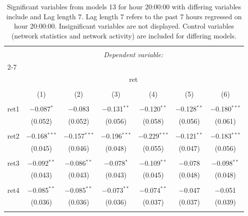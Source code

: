 
\begin{table}[!htbp] \centering 
  \caption{Significant variables from models 13 for hour 20:00:00 with differing variables include 
                               and Lag length 7. Lag length 7 refers to the past 7 hours regressed on hour 20:00:00. 
                               Insignificant variables are not displayed. 
                               Control variables (network statistics and network activity) are 
                               included for differing models.} 
  \label{RVmodels1_t_hourlagged7} 
\scriptsize 
\begin{tabular}{@{\extracolsep{5pt}}lcccccc} 
\\[-1.8ex]\hline 
\hline \\[-1.8ex] 
 & \multicolumn{6}{c}{\textit{Dependent variable:}} \\ 
\cline{2-7} 
\\[-1.8ex] & \multicolumn{6}{c}{ret} \\ 
\\[-1.8ex] & (1) & (2) & (3) & (4) & (5) & (6)\\ 
\hline \\[-1.8ex] 
 ret1 & $-$0.087$^{*}$ & $-$0.083 & $-$0.131$^{**}$ & $-$0.120$^{**}$ & $-$0.128$^{**}$ & $-$0.180$^{***}$ \\ 
  & (0.052) & (0.052) & (0.056) & (0.058) & (0.056) & (0.061) \\ 
  & & & & & & \\ 
 ret2 & $-$0.168$^{***}$ & $-$0.157$^{***}$ & $-$0.196$^{***}$ & $-$0.229$^{***}$ & $-$0.121$^{**}$ & $-$0.183$^{***}$ \\ 
  & (0.045) & (0.046) & (0.048) & (0.055) & (0.047) & (0.056) \\ 
  & & & & & & \\ 
 ret3 & $-$0.092$^{**}$ & $-$0.086$^{**}$ & $-$0.078$^{*}$ & $-$0.109$^{**}$ & $-$0.078 & $-$0.098$^{**}$ \\ 
  & (0.043) & (0.043) & (0.043) & (0.045) & (0.048) & (0.048) \\ 
  & & & & & & \\ 
 ret4 & $-$0.085$^{**}$ & $-$0.085$^{**}$ & $-$0.073$^{**}$ & $-$0.074$^{**}$ & $-$0.047 & $-$0.051 \\ 
  & (0.036) & (0.036) & (0.036) & (0.037) & (0.037) & (0.039) \\ 
  & & & & & & \\ 

\end{tabular}
\end{table}
